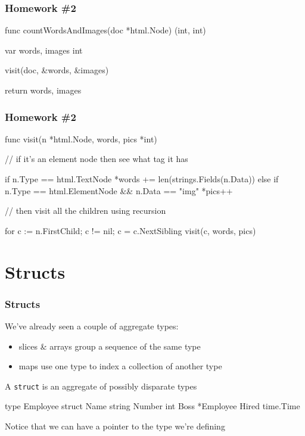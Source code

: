 \documentclass[handout,compress,t,11pt]{beamer}
\begin{document}
\begin{frame}[fragile]
\frametitle{Homework \#2}
\begin{golang}
func countWordsAndImages(doc *html.Node) (int, int) {
    var words, images int

    visit(doc, &words, &images)

    return words, images
}
\end{golang}
\end{frame}

\begin{frame}[fragile]
\frametitle{Homework \#2}
\begin{golang}
func visit(n *html.Node, words, pics *int) {
    // if it's an element node then see what tag it has

    if n.Type == html.TextNode {
        *words += len(strings.Fields(n.Data))
    } else if n.Type == html.ElementNode && n.Data == "img" {
        *pics++
    }

    // then visit all the children using recursion

    for c := n.FirstChild; c != nil; c = c.NextSibling {
        visit(c, words, pics)
    }
}
\end{golang}
\end{frame}


\section{Structs}
\begin{frame}[fragile]
    \frametitle{Structs}
    We've already seen a couple of aggregate types:
    \begin{itemize}
        \item slices \& arrays group a sequence of the same type
        \item maps use one type to index a collection of another type
    \end{itemize}
    \vspace{\baselineskip}
    A \verb|struct| is an aggregate of possibly disparate types \par
\begin{golang}
type Employee struct {
    Name   string
    Number int
    Boss   *Employee
    Hired  time.Time
}
\end{golang}
    \vspace{\baselineskip}
    Notice that we can have a pointer to the type we're defining \par
\end{frame}
\end{document}

